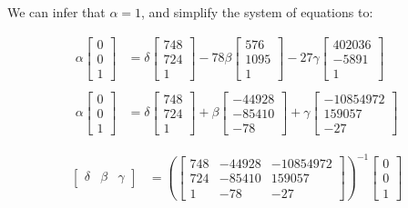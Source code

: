 \documentclass[12pt, oneside]{article}
\begin{document}
  We can infer that $\alpha = 1$, and simplify the system of equations to:
  
\begin{align*}
\alpha  \begin{bmatrix} 0  \\ 0   \\ 1   \end{bmatrix} &= 
\delta  \begin{bmatrix} 748   \\ 724   \\  1  \end{bmatrix} -
78\beta \begin{bmatrix} 576   \\ 1095   \\ 1   \end{bmatrix} 
- 27 \gamma  \begin{bmatrix} 402036  \\ -5891 \\ 1  \end{bmatrix} \\ \\ 
\alpha  \begin{bmatrix} 0  \\ 0   \\ 1   \end{bmatrix} &= 
\delta  \begin{bmatrix} 748   \\ 724   \\  1  \end{bmatrix} +
\beta \begin{bmatrix} -44928  \\ -85410   \\ -78   \end{bmatrix} +
\gamma  \begin{bmatrix} -10854972  \\ 159057 \\ -27 \end{bmatrix} 
\end{align*} 

\begin{align*}
\begin{bmatrix} \delta & \beta & \gamma \end{bmatrix}  
&= \left(\begin{bmatrix}
748 & -44928 & -10854972   \\
724 & -85410 & 159057 \\
1   & -78     & -27	
\end{bmatrix} \right) ^{-1}
\begin{bmatrix}
0  \\
0   \\
1  
\end{bmatrix}
\end{align*} 
\end{document}
